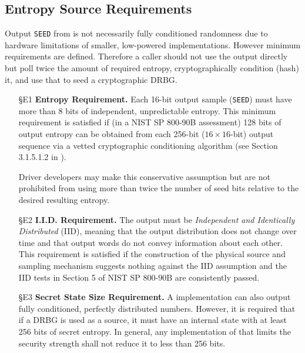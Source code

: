 {\subsection{Entropy Source Requirements}
\label{sec:req-es}

    Output \verb|SEED| from  is not necessarily fully
    conditioned randomness due to hardware limitations of smaller,
    low-powered implementations. However minimum requirements are
    defined. Therefore a caller should not use the output directly but poll
    twice the amount of required entropy, cryptographically condition
    (hash) it, and use that to seed a cryptographic DRBG.

    \begin{itemize}

    \item[\S E1]    {\bf Entropy Requirement.}
    Each 16-bit output sample (\verb|SEED|) must have more than 8 bits of
    independent, unpredictable entropy. This minimum requirement is
    satisfied if (in a NIST SP 800-90B \cite{TuBaKe+18} assessment) 128
    bits of output entropy can be obtained from each 256-bit
    ($16 \times 16$-bit)  output sequence via a vetted
    cryptographic conditioning algorithm (see Section 3.1.5.1.2 in
    \cite{TuBaKe+18}).

    Driver developers may make this conservative assumption but are not
    prohibited from using more than twice the number of seed bits relative
    to the desired resulting entropy.

    \item[\S E2]    {\bf I.I.D. Requirement.}
    The output must be \emph{Independent and Identically Distributed}
    (IID), meaning that the output distribution does not change over time
    and that output words do not convey information about each other.
    This requirement is satisfied if the construction of the physical source
    and sampling mechanism suggests nothing against the IID assumption
    and the IID tests in Section 5 of NIST SP 800-90B \cite{TuBaKe+18} are
    consistently passed.

    \item[\S E3]    {\bf Secret State Size Requirement.}
    A  implementation can also output fully conditioned,
    perfectly distributed numbers. However, it is required that if a DRBG is
    used as a source, it must have an internal state with at least 256 bits
    of secret entropy. In general, any implementation of 
    that limits the security strength shall not reduce it to less than
    256 bits.


\end{itemize}}
